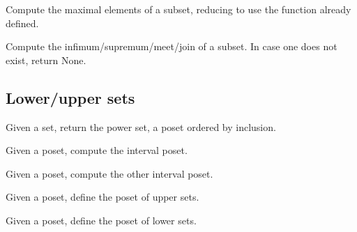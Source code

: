 \begin{gradedexercise}
Compute the maximal elements of a subset, reducing
to use the function  already defined.


\end{gradedexercise}


\begin{gradedexercise}
Compute the infimum/supremum/meet/join of a subset.
In case one does not exist, return None.


\end{gradedexercise}

\subsection{Lower/upper sets}
\begin{gradedexercise}
Given a set, return the power set, a poset ordered by inclusion.

\end{gradedexercise}


\begin{gradedexercise}
Given a poset, compute the interval poset.

\end{gradedexercise}


\begin{gradedexercise}
Given a poset, compute the other interval poset.

\end{gradedexercise}


\begin{gradedexercise}
Given a poset, define the poset of upper sets.

\end{gradedexercise}

\begin{gradedexercise}
Given a poset, define the poset of lower sets.
\end{gradedexercise}


